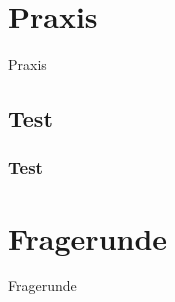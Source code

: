 \documentclass[xcolor=dvipsnames]{beamer}
\begin{document}
    \section{Praxis}
    {
        \begin{frame}
            \begin{center}
                \Huge Praxis
            \end{center}
        \end{frame}
    }

    \subsection{Test}
    \begin{frame}
        \frametitle{Test}
    \end{frame}

    \section{Fragerunde}
    {
        \begin{frame}
            \begin{center}
                \Huge Fragerunde
            \end{center}
        \end{frame}
    }
\end{document}
